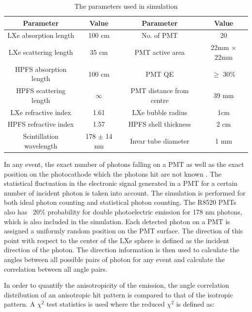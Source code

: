 \begin{table}[h]
  \centering
  \caption{The parameters used in simulation}
  \label{tab:OptPar}
  \begin{tabular}{|c c||c c|}
  \hline
  Parameter & Value & Parameter & Value \\
  \hline
  LXe absorption length & 100 cm & No. of PMT & 20\\
  LXe scattering length & 35 cm & PMT active area & 22mm $\times$ 22mm\\
  HPFS absorption length & 100 cm & PMT QE & $\geq$ 30\% \\
  HPFS scattering length & $\infty$ & PMT distance from centre & 39 mm\\
  LXe refractive index & 1.61 & LXe bubble radius & 1cm\\
  HPFS refractive index & 1.57 & HPFS shell thickness & 2 cm \\
  Scintillation wavelength & 178 $\pm$ 14 nm & Invar tube diameter & 1 mm\\
  \hline
 \end{tabular}
\end{table}

In any event, the exact number of photons falling on a PMT as well as the exact position 
on the photocathode which the photons hit are not known . The statistical fluctuation 
in the electronic signal generated in a PMT for a certain number of incident photon is 
taken into account. The simulation is performed for both 
ideal photon counting and statistical photon counting. The R8520 PMTs also has  ~20\% probability 
for double photoelectric emission for 178 nm photons, which is also included in the simulation.
Each detected photon on a PMT is assigned a uniformly random position on the PMT surface. 
The direction of this point with respect 
to the center of the LXe sphere is defined as the incident direction of the photon. The direction information 
is then used to calculate the angles between all possible pairs of photon for any event and 
calculate the correlation between all angle pairs.

In order to quantify the anisotropicity of the emission, 
the angle correlation distribution of an anisotropic hit pattern is compared to that of the isotropic 
pattern. A $\chi^2$ test statistics is used where the reduced $\chi^2$ is defined as: 


